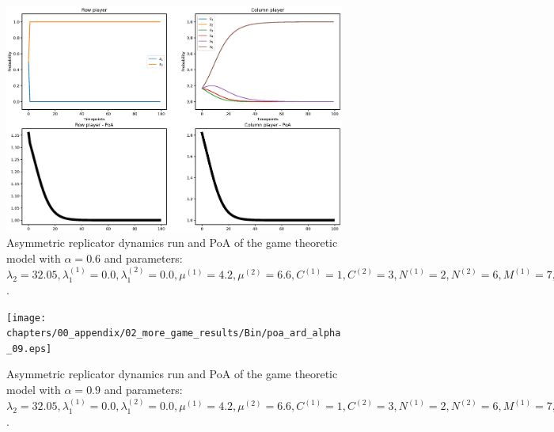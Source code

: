 \begin{figure}[H]
    \includegraphics[width=\textwidth, trim = 0 60 0 60, clip]{chapters/00_appendix/02_more_game_results/Bin/poa_ard_alpha_06.eps}
    \caption{Asymmetric replicator dynamics run and PoA of the game theoretic
    model with \(\alpha = 0.6\) and parameters: \(\lambda_2 = 32.05,
    \lambda_1^{(1)} = 0.0, \lambda_1^{(2)} = 0.0, \mu^{(1)} = 4.2,
    \mu^{(2)} = 6.6, C^{(1)} = 1, C^{(2)} = 3, N^{(1)} = 2, N^{(2)} = 6,
    M^{(1)} = 7, M^{(2)} = 4, t = 2.0\).}
    \label{fig:poa_ard_alpha_06}
\end{figure}



\begin{figure}[H]
    \texttt{[image: chapters/00\_appendix/02\_more\_game\_results/Bin/poa\_ard\_alpha\_09.eps]}
    \caption{Asymmetric replicator dynamics run and PoA of the game theoretic
    model with \(\alpha = 0.9\) and parameters: \(\lambda_2 = 32.05,
    \lambda_1^{(1)} = 0.0, \lambda_1^{(2)} = 0.0, \mu^{(1)} = 4.2,
    \mu^{(2)} = 6.6, C^{(1)} = 1, C^{(2)} = 3, N^{(1)} = 2, N^{(2)} = 6,
    M^{(1)} = 7, M^{(2)} = 4, t = 2.0\).}
    \label{fig:poa_ard_alpha_09}
\end{figure}



